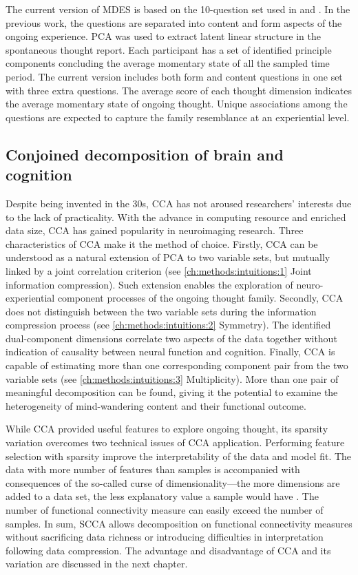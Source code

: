 The current version of MDES is based on the 10-question set used in  and . In the previous work, the questions are separated into content and form aspects of the ongoing experience. PCA was used to extract latent linear structure in the spontaneous thought report. Each participant has a set of identified principle components concluding the average momentary state of all the sampled time period. The current version includes both form and content questions in one set with three extra questions. The average score of each thought dimension indicates the average momentary state of ongoing thought. Unique associations among the questions are expected to capture the family resemblance at an experiential level. 

% 

\subsection{Conjoined decomposition of brain and cognition}

Despite being invented in the 30s, CCA has not aroused researchers' interests due to the lack of practicality. With the advance in computing resource and enriched data size, CCA has gained popularity in neuroimaging research. Three characteristics of CCA make it the method of choice. Firstly, CCA can be understood as a natural extension of PCA to two variable sets, but mutually linked by a joint correlation criterion (see \ref{ch:methods:intuitions:1} Joint information compression). Such extension enables the exploration of neuro-experiential component processes of the ongoing thought family. Secondly, CCA does not distinguish between the two variable sets during the information compression process (see \ref{ch:methods:intuitions:2} Symmetry). The identified dual-component dimensions correlate two aspects of the data together without indication of causality between neural function and cognition. Finally, CCA is capable of estimating more than one corresponding component pair from the two variable sets (see \ref{ch:methods:intuitions:3} Multiplicity). More than one pair of meaningful decomposition can be found, giving it the potential to examine the heterogeneity of mind-wandering content and their functional outcome. 

While CCA provided useful features to explore ongoing thought, its sparsity variation overcomes two technical issues of CCA application. Performing feature selection with sparsity improve the interpretability of the data and model fit. The data with more number of features than samples is accompanied with consequences of the so-called curse of dimensionality---the more dimensions are added to a data set, the less explanatory value a sample would have \cite{Domingos2012}. The number of functional connectivity measure can easily exceed the number of samples. In sum, SCCA allows decomposition on functional connectivity measures without sacrificing data richness or introducing difficulties in interpretation following data compression. The advantage and disadvantage of CCA and its variation are discussed in the next chapter.

